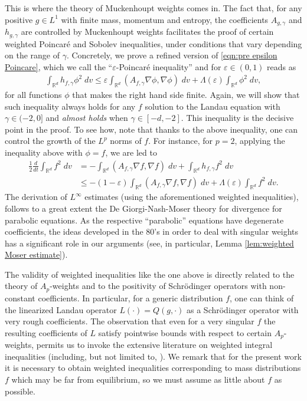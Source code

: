 \documentclass[12pt,american]{amsart}
\numberwithin{equation}{section}
\theoremstyle{plain}
\theoremstyle{definition}                  %
\begin{document}
This is where the theory of Muckenhoupt weights comes in. The fact that, for any positive $g \in L^1$ with finite mass, momentum and entropy, the coefficients $A_{g,\gamma}$ and $h_{g,\gamma}$ are controlled by Muckenhoupt weights facilitates the proof of certain weighted Poincar\'e and Sobolev inequalities, under conditions that vary depending on the range of $\gamma$. Concretely, we prove a refined version of \eqref{eqn:pre epsilon Poincare}, which we call the ``$\varepsilon$-Poincar\'e inequality'' and for $\varepsilon \in (0,1)$ reads as
\begin{align*}
  \int_{\mathbb{R}^d} h_{f,\gamma} \phi^2\;dv \leq \varepsilon \int_{\mathbb{R}^d} (A_{f,\gamma} \nabla \phi,\nabla \phi)\;dv + \Lambda(\varepsilon) \int_{\mathbb{R}^d} \phi^2\;dv,%
\end{align*}
for all functions $\phi$ that makes the right hand side finite.
Again, we will show that such inequality always holds for any $f$ solution to the Landau equation with $\gamma \in (-2,0]$ and {\em almost holds} when $\gamma \in [-d,-2]$. 
This inequality is the decisive point in the proof. To see how, note that thanks to the above inequality, one can control the growth of the $L^p$ norms of $f$. For instance, for $p=2$, applying the inequality above with $\phi=f$, we are led to
\begin{align*}
\frac{1}{2}\frac{d}{dt} \int_{\mathbb{R}^d} f^2\;dv & =  - \int_{\mathbb{R}^d} (A_{f,\gamma} \nabla f,\nabla f)\;dv +\int_{\mathbb{R}^d} h_{f,\gamma} f^2\;dv \\
& \leq  -(1-\varepsilon) \int_{\mathbb{R}^d} (A_{f,\gamma} \nabla f,\nabla f)\;dv  +  \Lambda(\varepsilon) \int_{\mathbb{R}^d} f^2\;dv.
\end{align*}
The derivation of $L^\infty$ estimates (using the aforementioned weighted inequalities), follows to a great extent the De Giorgi-Nash-Moser theory for divergence for parabolic equations. As the respective ``parabolic'' equations have degenerate coefficients, the ideas developed in the 80's in order to deal with singular weights \cite{FKS82, GuWhe91}  has a significant role in our arguments (see, in particular, Lemma \ref{lem:weighted Moser estimate}). 

The validity of weighted inequalities like the one above is directly related to the theory of $A_p$-weights and to the positivity of Schr\"odinger operators with non-constant coefficients. In particular, for a generic distribution $f$, one can think of the linearized Landau operator $L(\cdot) = Q(g,\cdot)$ as a Schr\"odinger operator with very rough coefficients. The observation that even for a very singular $f$ the resulting coefficients of $L$ satisfy pointwise bounds with respect to certain $A_p$-weights, permits us to invoke the extensive literature on weighted integral inequalities (including, but not limited to, \cite{Fefferman1983}). We remark that for the present work it is necessary to obtain weighted inequalities corresponding to mass distributions $f$ which may be far from equilibrium, so we must assume as little about $f$ as possible. 
\end{document}
